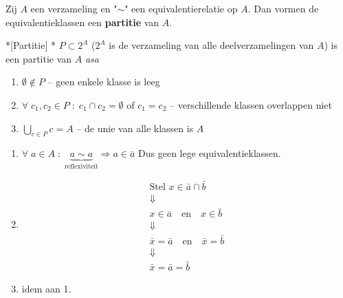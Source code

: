 
\begin{nicelemma}
    Zij $A$ een verzameling en "$\sim$" een equivalentierelatie op $A$. Dan vormen de equivalentieklassen een \textcolor{purple!50!black}{\textbf{partitie}} van $A$.
\end{nicelemma}

\begin{center}
\resizebox{0.5\textwidth}{!}{%
    
}
\end{center}

\begin{nicedefinition}*[Partitie]
    \nextpart[Definitie:]*
    $P \subset 2^A$ ($2^A$ is de verzameling van alle deelverzamelingen van $A$) is een partitie van $A$ \emph{asa}
    \begin{enumerate}
        \item $\emptyset \notin P$ -- geen enkele klasse is leeg
        \item $\forall \; c_1, c_2 \in P \;:\; c_1 \cap c_2 = \emptyset$ of $c_1 = c_2$ -- verschillende klassen overlappen niet
        \item $\bigcup_{c \in P}c = A$ -- de unie van alle klassen is $A$
    \end{enumerate}
\end{nicedefinition}

\textbf{}
\begin{enumerate}
    \item $\forall \; a \in A \;:\; \underbrace{a \sim a}_{\text{reflexiviteit}} \Rightarrow a \in \bar{a}$ Dus geen lege equivalentieklassen.
    \item \begin{equation*}
        \begin{gathered}
            \text{Stel } x \in \bar{a} \cap \bar{b} \\
            \Downarrow \\
            x \in \bar{a} \quad \text{en} \quad x \in \bar{b} \\
            \Downarrow \\
            \bar{x} = \bar{a} \quad \text{en} \quad \bar{x} = \bar{b} \\
            \Downarrow \\
            \bar{x} = \bar{a} = \bar{b}
        \end{gathered}
    \end{equation*}

    \item idem aan 1.
\end{enumerate}

